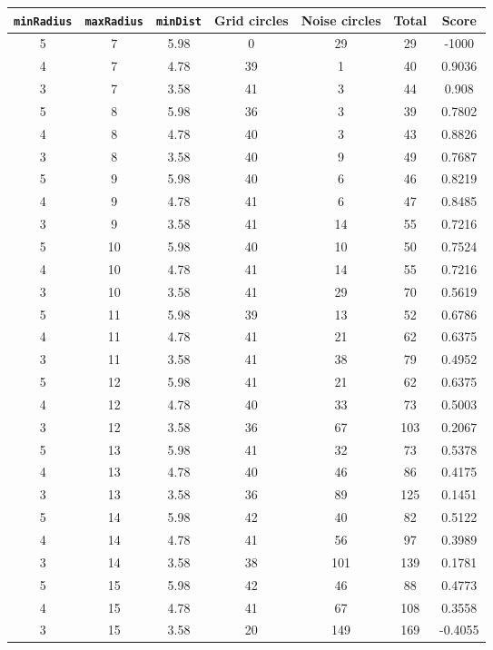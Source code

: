 \documentclass[letterpaper, 12pt]{article}
\begin{document}
\begin{longtable}{|c|c|c|c|c|c|c|}
\hline
\textbf{\texttt{minRadius}} & \textbf{\texttt{maxRadius}} & \textbf{\texttt{minDist}} & \textbf{Grid circles} & \textbf{Noise circles} & \textbf{Total} & \textbf{Score} \\
\hline
5 & 7 & 5.98 & 0 & 29 & 29 & -1000 \\
\hline
4 & 7 & 4.78 & 39 & 1 & 40 & 0.9036 \\
\hline
3 & 7 & 3.58 & 41 & 3 & 44 & 0.908 \\
\hline
5 & 8 & 5.98 & 36 & 3 & 39 & 0.7802 \\
\hline
4 & 8 & 4.78 & 40 & 3 & 43 & 0.8826 \\
\hline
3 & 8 & 3.58 & 40 & 9 & 49 & 0.7687 \\
\hline
5 & 9 & 5.98 & 40 & 6 & 46 & 0.8219 \\
\hline
4 & 9 & 4.78 & 41 & 6 & 47 & 0.8485 \\
\hline
3 & 9 & 3.58 & 41 & 14 & 55 & 0.7216 \\
\hline
5 & 10 & 5.98 & 40 & 10 & 50 & 0.7524 \\
\hline
4 & 10 & 4.78 & 41 & 14 & 55 & 0.7216 \\
\hline
3 & 10 & 3.58 & 41 & 29 & 70 & 0.5619 \\
\hline
5 & 11 & 5.98 & 39 & 13 & 52 & 0.6786 \\
\hline
4 & 11 & 4.78 & 41 & 21 & 62 & 0.6375 \\
\hline
3 & 11 & 3.58 & 41 & 38 & 79 & 0.4952 \\
\hline
5 & 12 & 5.98 & 41 & 21 & 62 & 0.6375 \\
\hline
4 & 12 & 4.78 & 40 & 33 & 73 & 0.5003 \\
\hline
3 & 12 & 3.58 & 36 & 67 & 103 & 0.2067 \\
\hline
5 & 13 & 5.98 & 41 & 32 & 73 & 0.5378 \\
\hline
4 & 13 & 4.78 & 40 & 46 & 86 & 0.4175 \\
\hline
3 & 13 & 3.58 & 36 & 89 & 125 & 0.1451 \\
\hline
5 & 14 & 5.98 & 42 & 40 & 82 & 0.5122 \\
\hline
4 & 14 & 4.78 & 41 & 56 & 97 & 0.3989 \\
\hline
3 & 14 & 3.58 & 38 & 101 & 139 & 0.1781 \\
\hline
5 & 15 & 5.98 & 42 & 46 & 88 & 0.4773 \\
\hline
4 & 15 & 4.78 & 41 & 67 & 108 & 0.3558 \\
\hline
3 & 15 & 3.58 & 20 & 149 & 169 & -0.4055 \\

\end{longtable}
\end{document}
